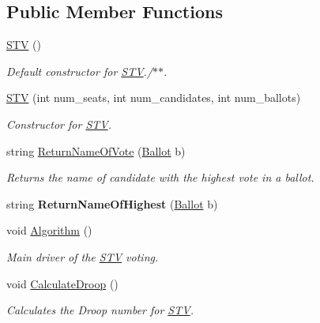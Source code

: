 \subsection*{Public Member Functions}
\begin{DoxyCompactItemize}
\item 
\mbox{\hyperlink{class_s_t_v_a9ccdab1558b1936150844bbd506b4197}{S\+TV}} ()
\begin{DoxyCompactList}\small\item\em Default constructor for \mbox{\hyperlink{class_s_t_v}{S\+TV}}./$\ast$$\ast$. \end{DoxyCompactList}\item 
\mbox{\hyperlink{class_s_t_v_a07f1d636448505df93a855cf1c25c02a}{S\+TV}} (int num\+\_\+seats, int num\+\_\+candidates, int num\+\_\+ballots)
\begin{DoxyCompactList}\small\item\em Constructor for \mbox{\hyperlink{class_s_t_v}{S\+TV}}. \end{DoxyCompactList}\item 
string \mbox{\hyperlink{class_s_t_v_a05737f758ce07cce32067285d1b388b4}{Return\+Name\+Of\+Vote}} (\mbox{\hyperlink{class_ballot}{Ballot}} b)
\begin{DoxyCompactList}\small\item\em Returns the name of candidate with the highest vote in a ballot. \end{DoxyCompactList}\item 
\mbox{\label{class_s_t_v_a10017763ebb9c046361a0c63354906b8}} 
string {\bfseries Return\+Name\+Of\+Highest} (\mbox{\hyperlink{class_ballot}{Ballot}} b)
\item 
\mbox{\label{class_s_t_v_ac77d6adc39f384482f03ddd9b1977132}} 
void \mbox{\hyperlink{class_s_t_v_ac77d6adc39f384482f03ddd9b1977132}{Algorithm}} ()
\begin{DoxyCompactList}\small\item\em Main driver of the \mbox{\hyperlink{class_s_t_v}{S\+TV}} voting. \end{DoxyCompactList}\item 
\mbox{\label{class_s_t_v_ac0253d507a1a4897385d0b1b1245beeb}} 
void \mbox{\hyperlink{class_s_t_v_ac0253d507a1a4897385d0b1b1245beeb}{Calculate\+Droop}} ()
\begin{DoxyCompactList}\small\item\em Calculates the Droop number for \mbox{\hyperlink{class_s_t_v}{S\+TV}}. \end{DoxyCompactList}\item 

\end{DoxyCompactItemize}
